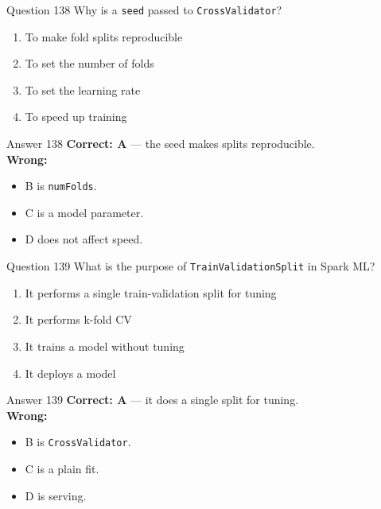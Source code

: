 \documentclass[aspectratio=169,11pt]{beamer}
\begin{document}
	\begin{frame}{Question 138}
		Why is a \texttt{seed} passed to \texttt{CrossValidator}?
		\begin{enumerate}[label=(\Alph*)]
			\item To make fold splits reproducible
			\item To set the number of folds
			\item To set the learning rate
			\item To speed up training
		\end{enumerate}
	\end{frame}
	\begin{frame}{Answer 138}
		\textbf{Correct: A} --- the seed makes splits reproducible.\\
		\vspace{0.5em}
		\textbf{Wrong:}
		\begin{itemize}
			\item B is \texttt{numFolds}.
			\item C is a model parameter.
			\item D does not affect speed.
		\end{itemize}
	\end{frame}
	
	\begin{frame}{Question 139}
		What is the purpose of \texttt{TrainValidationSplit} in Spark ML?
		\begin{enumerate}[label=\Alph*.]
			\item It performs a single train-validation split for tuning
			\item It performs k-fold CV
			\item It trains a model without tuning
			\item It deploys a model
		\end{enumerate}
	\end{frame}
	\begin{frame}{Answer 139}
		\textbf{Correct: A} --- it does a single split for tuning.\\
		\vspace{0.5em}
		\textbf{Wrong:}
		\begin{itemize}
			\item B is \texttt{CrossValidator}.
			\item C is a plain fit.
			\item D is serving.
		\end{itemize}
	\end{frame}
	
\end{document}
